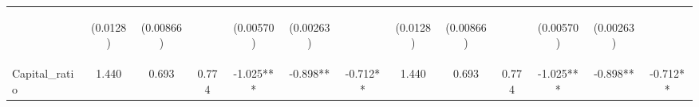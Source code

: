 \documentclass[]{article}
\begin{document}
\begin{center}
\begin{tabular}{lcccccccccccc}
\vspace{4pt} & \begin{footnotesize}(0.0128)\end{footnotesize} & \begin{footnotesize}(0.00866)\end{footnotesize} & \begin{footnotesize}\end{footnotesize} & \begin{footnotesize}(0.00570)\end{footnotesize} & \begin{footnotesize}(0.00263)\end{footnotesize} & \begin{footnotesize}\end{footnotesize} & \begin{footnotesize}(0.0128)\end{footnotesize} & \begin{footnotesize}(0.00866)\end{footnotesize} & \begin{footnotesize}\end{footnotesize} & \begin{footnotesize}(0.00570)\end{footnotesize} & \begin{footnotesize}(0.00263)\end{footnotesize} & \begin{footnotesize}\end{footnotesize} \\
Capital\_ratio & 1.440 & 0.693 & 0.774 & -1.025*** & -0.898** & -0.712** & 1.440 & 0.693 & 0.774 & -1.025*** & -0.898** & -0.712** \\

\end{tabular}
\end{center}
\end{document}
